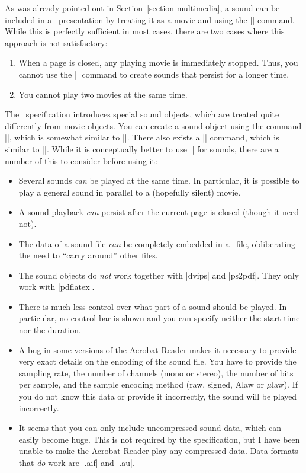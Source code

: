 As was already pointed out in Section~\ref{section-multimedia}, a
sound can be included in a \pdf\ presentation by treating it as a
movie and using the |\movie| command. While this is perfectly
sufficient in most cases, there are two cases where this approach is
not satisfactory:
\begin{enumerate}
\item
  When a page is closed, any playing movie is immediately
  stopped. Thus, you cannot use the |\movie| command to create sounds
  that persist for a longer time.
\item
  You cannot play two movies at the same time.
\end{enumerate}

The \pdf\ specification introduces special sound objects, which are
treated quite differently from movie objects. You can create a sound
object using the command |\sound|, which is somewhat similar to
|\movie|. There also exists a |\hyperlinksound| command, which is
similar to |\hyperlinkmovie|. While it is conceptually better to use
|\sound| for sounds, there are a number of this to consider before
using it:
\begin{itemize}
\item
  Several sounds \emph{can} be played at the same time. In particular,
  it is possible to play a general sound in parallel to a (hopefully
  silent) movie.
\item
  A sound playback \emph{can} persist after the current page is closed
  (though it need not).
\item
  The data of a sound file \emph{can} be completely embedded in a
  \pdf\ file, obliberating the need to ``carry around'' other files.
\item
  The sound objects do \emph{not} work together with |dvips| and
  |ps2pdf|. They only work with |pdflatex|.
\item
  There is much less control over what part of a sound should be
  played. In particular, no control bar is shown and you can
  specify neither the start time nor the duration.
\item
  A bug in some versions of the Acrobat Reader makes it necessary to
  provide very exact details on the encoding of the sound file. You
  have to provide the sampling rate, the number of channels (mono or
  stereo), the number of bits per sample, and the sample encoding
  method (raw, signed, Alaw or $\mu$law). If you do not know this data
  or provide it incorrectly, the sound will be played incorrectly.
\item
  It seems  that you can only include uncompressed sound data,
  which can easily become huge. This is not required by the
  specification, but I have been unable to make the Acrobat Reader
  play any compressed data. Data formats that \emph{do} work are
  |.aif| and |.au|.
\end{itemize}


